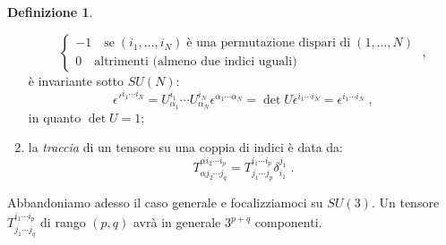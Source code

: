 \documentclass[12pt,a4paper]{article}
\theoremstyle{definition}
\newtheorem{dfn}{Definizione}[section]
\numberwithin{equation}{section}
\begin{document}
\begin{dfn}
\begin{enumerate}
\begin{equation}
\begin{cases}
-1\quad \mbox{se}\; (i_1,\ldots,i_N)\;\mbox{è una permutazione dispari di}\; (1,\ldots,N) \\
0\quad \mbox{altrimenti (almeno due indici uguali)}
\end{cases}\;,
\end{equation}
è invariante sotto $SU(N)$:
\begin{equation}
\epsilon'^{i_1\cdots i_N}=U^{i_1}_{\alpha_1}\cdots U^{i_N}_{\alpha_N}\epsilon^{\alpha_1\cdots\alpha_N}=\det U\epsilon^{i_1\cdots i_N}=\epsilon^{i_1\cdots i_N}\;,
\end{equation}
in quanto $\det U=1$;
\item la \emph{traccia} di un tensore su una coppia di indici è data da:
\begin{equation}
T^{\alpha i_2\cdots i_p}_{\alpha j_2\cdots j_q}=T^{i_1\cdots i_p}_{j_1\cdots j_p}\delta^{j_1}_{i_1}\;.
\end{equation}
\end{enumerate}
\end{dfn}
Abbandoniamo adesso il caso generale e focalizziamoci su $SU(3)$. Un tensore $T^{i_1\cdots i_p}_{j_1\cdots j_q}$ di rango $(p,q)$ avrà in generale $3^{p+q}$ componenti.
\end{document}
